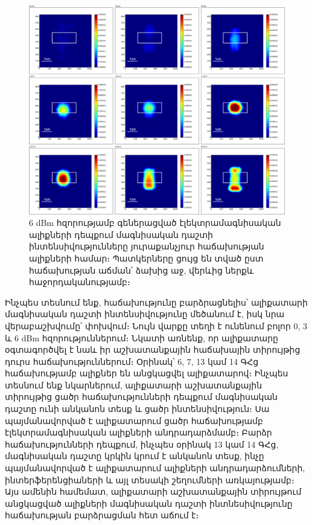 \documentclass[12pt, fleqn]{report}
\begin{document}
\begin{figure}
    \begin{adjustwidth}{-1.5cm}{}
    \centering
    \includegraphics[width=1.0\textwidth]{data/experiment-results/free field of antenna, 6-14ghz, 6dbm generator output, distance 5mm.png}
    \caption{6 dBm հզորությամբ գեներացված էլեկտրամագնիսական ալիքների դեպքում մագնիսական դաշտի ինտենսիվությունները յուրաքանչյուր հաճախության ալիքների համար։ Պատկերները ցույց են տված ըստ հաճախության աճման՝ ձախից աջ, վերևից ներքև հաջորդականությամբ։}
    \label{fig:6dBm-diagram}
\end{adjustwidth}
\end{figure}
Ինչպես տեսնում ենք, հաճախությունը բարձրացնելիս՝ ալիքատարի մագնիսական դաշտի ինտենսիվությունը մեծանում է, իսկ նրա վերաբաշխվումը՝ փոխվում։ Նույն վարքը տեղի է ունենում բոլոր 0, 3 և 6 dBm հզորություններում։ Նկատի առնենք, որ ալիքատարը օգտագործվել է նաև իր աշխատանքային հաճախային տիրույթից դուրս հաճախություններում։ Օրինակ՝ 6, 7, 13 կամ 14 ԳՀց հաճախությամբ ալիքներ են անցկացվել ալիքատարով։ Ինչպես տեսնում ենք նկարներում, ալիքատարի աշխատանքային տիրույթից ցածր հաճախությունների դեպքում մագնիսական դաշտը ունի անկանոն տեսք և ցածր ինտենսիվություն։ Սա պայմանավորված է ալիքատարում ցածր հաճախությամբ էլեկտրամագնիսական ալիքների անդրադարձմամբ։ Բարձր հաճախությունների դեպքում, ինչպես օրինակ 13 կամ 14 ԳՀց, մագնիսական դաշտը կրկին կրում է անկանոն տեսք, ինչը պայմանավորված է ալիքատարում ալիքների անդրադարձումների, ինտերֆերենցիաների և այլ տեսակի շեղումների առկայությամբ։ Այս ամենին համեմատ, ալիքատարի աշխատանքային տիրույթում անցկացված ալիքների մագնիսական դաշտի ինտնեսիվությունը հաճախության բարձրացման հետ աճում է։
\end{document}
